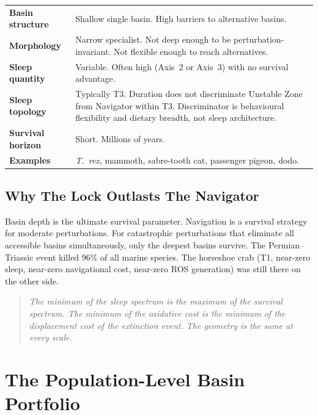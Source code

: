 \documentclass[10pt, a4paper]{article}
\begin{document}
\begin{mdframed}[
  backgroundcolor=unstablebox,
  linecolor=red!40!black,
  linewidth=0.8pt,
  innertopmargin=0.5em,
  innerbottommargin=0.5em,
  innerleftmargin=0.8em,
  innerrightmargin=0.8em
]
\small
\begin{tabular}{p{3.0cm}p{9.5cm}}
\textbf{Basin structure} &
Shallow single basin. High barriers to
alternative basins.\\[0.2em]
\textbf{Morphology} &
Narrow specialist. Not deep enough to
be perturbation-invariant. Not flexible
enough to reach alternatives.\\[0.2em]
\textbf{Sleep quantity} &
Variable. Often high (Axis~2 or Axis~3)
with no survival advantage.\\[0.2em]
\textbf{Sleep topology} &
Typically T3. Duration does not
discriminate Unstable Zone from Navigator
within T3. Discriminator is behavioural
flexibility and dietary breadth, not
sleep architecture.\\[0.2em]
\textbf{Survival horizon} &
Short. Millions of years.\\[0.2em]
\textbf{Examples} &
\textit{T.~rex}, mammoth, sabre-tooth
cat, passenger pigeon, dodo.\\
\end{tabular}
\end{mdframed}

\subsection{Why The Lock Outlasts
The Navigator}

Basin depth is the ultimate survival
parameter. Navigation is a survival
strategy for moderate perturbations.
For catastrophic perturbations that
eliminate all accessible basins
simultaneously, only the deepest basins
survive. The Permian--Triassic event
killed 96\% of all marine species.
The horseshoe crab (T1, near-zero
sleep, near-zero navigational cost,
near-zero ROS generation) was still
there on the other side.

\begin{quote}
\itshape
The minimum of the sleep spectrum is
the maximum of the survival spectrum.
The minimum of the oxidative cost is
the minimum of the displacement cost
of the extinction event.
The geometry is the same at every scale.
\end{quote}

\section{The Population-Level Basin
Portfolio}
\label{sec:portfolio}
\end{document}
